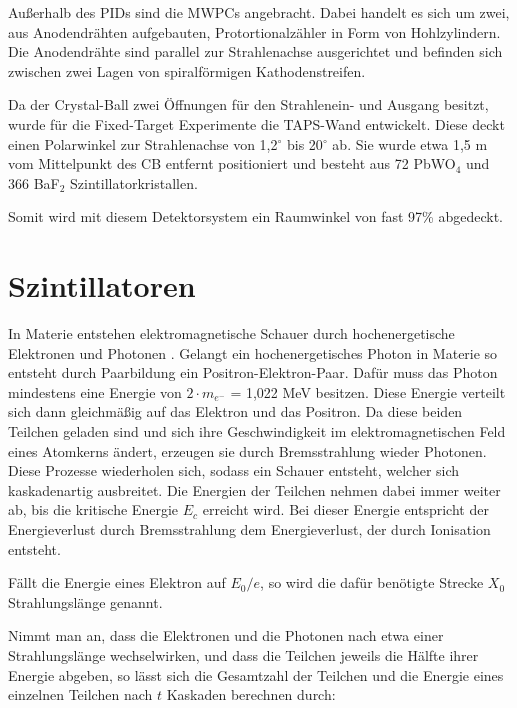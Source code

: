 \documentclass[a4paper,11pt,oneside,final,german,openbib,pdftex]{scrbook}
\begin{document}
{Au{\ss}erhalb des PIDs sind die MWPCs angebracht. Dabei handelt es sich um zwei, aus Anodendr\"ahten aufgebauten, Protortionalz\"ahler in Form von Hohlzylindern. Die Anodendr\"ahte sind parallel zur Strahlenachse ausgerichtet und befinden sich zwischen zwei Lagen von spiralf\"ormigen Kathodenstreifen. 

Da der Crystal-Ball zwei \"Offnungen f\"ur den Strahlenein- und Ausgang besitzt, wurde f\"ur die Fixed-Target Experimente die TAPS-Wand entwickelt.
Diese deckt einen Polarwinkel zur Strahlenachse von 1,2$^{\circ}$ bis 20$^{\circ}$ ab. Sie wurde etwa 1,5 m vom Mittelpunkt des CB entfernt positioniert und besteht aus 72 PbWO$_4$ und 366 BaF$_2$ Szintillatorkristallen. 

Somit wird mit diesem Detektorsystem ein Raumwinkel von fast 97\% abgedeckt.

\section{Szintillatoren}
\label{sec:Szintillatoren}

In Materie entstehen elektromagnetische Schauer durch hochenergetische Elektronen und Photonen \cite{Leo87}.
Gelangt ein hochenergetisches Photon in Materie so entsteht durch Paarbildung ein Positron-Elektron-Paar. Dafür muss das Photon mindestens eine Energie von $2\cdot m_{e^-}$ = 1,022 MeV besitzen. Diese Energie verteilt sich dann gleichmäßig auf das Elektron und das Positron. Da diese beiden Teilchen geladen sind und sich ihre Geschwindigkeit im elektromagnetischen Feld eines Atomkerns ändert, erzeugen sie durch Bremsstrahlung wieder Photonen. Diese Prozesse wiederholen sich, sodass ein Schauer entsteht, welcher sich kaskadenartig ausbreitet. Die Energien der Teilchen nehmen dabei immer weiter ab, bis die kritische Energie $E_c$ erreicht wird. Bei dieser Energie entspricht der Energieverlust durch Bremsstrahlung dem Energieverlust, der durch Ionisation entsteht.

Fällt die Energie eines Elektron auf $E_0/e$, so wird die dafür benötigte Strecke $X_0$ Strahlungslänge genannt.
\newline

Nimmt man an, dass die Elektronen und die Photonen nach etwa einer Strahlungslänge wechselwirken, und dass die Teilchen jeweils die Hälfte ihrer Energie abgeben, so lässt sich die Gesamtzahl der Teilchen und die Energie eines einzelnen Teilchen nach $t$ Kaskaden berechnen durch\cite{Leo87}:

}
\end{document}
